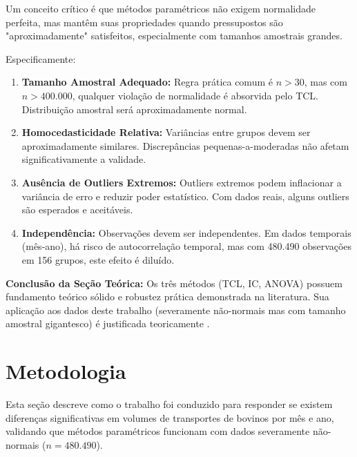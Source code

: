 \documentclass[12pt,a4paper]{article}
\begin{document}
Um conceito crítico é que métodos paramétricos não exigem normalidade perfeita, mas mantêm suas propriedades quando pressupostos são "aproximadamente" satisfeitos, especialmente com tamanhos amostrais grandes.

Especificamente:

\begin{enumerate}
    \item \textbf{Tamanho Amostral Adequado:} Regra prática comum é $n > 30$, mas com $n > 400.000$, qualquer violação de normalidade é absorvida pelo TCL. Distribuição amostral será aproximadamente normal.
    
    \item \textbf{Homocedasticidade Relativa:} Variâncias entre grupos devem ser aproximadamente similares. Discrepâncias pequenas-a-moderadas não afetam significativamente a validade.
    
    \item \textbf{Ausência de Outliers Extremos:} Outliers extremos podem inflacionar a variância de erro e reduzir poder estatístico. Com dados reais, alguns outliers são esperados e aceitáveis.
    
    \item \textbf{Independência:} Observações devem ser independentes. Em dados temporais (mês-ano), há risco de autocorrelação temporal, mas com 480.490 observações em 156 grupos, este efeito é diluído.
\end{enumerate}

\textbf{Conclusão da Seção Teórica:} Os três métodos (TCL, IC, ANOVA) possuem fundamento teórico sólido e robustez prática demonstrada na literatura. Sua aplicação aos dados deste trabalho (severamente não-normais mas com tamanho amostral gigantesco) é justificada teoricamente \cite{Montgomery2013, Devore2015}.



\newpage

\newpage
\section{Metodologia}

Esta seção descreve como o trabalho foi conduzido para responder se existem diferenças significativas em volumes de transportes de bovinos por mês e ano, validando que métodos paramétricos funcionam com dados severamente não-normais ($n = 480.490$).
\end{document}
